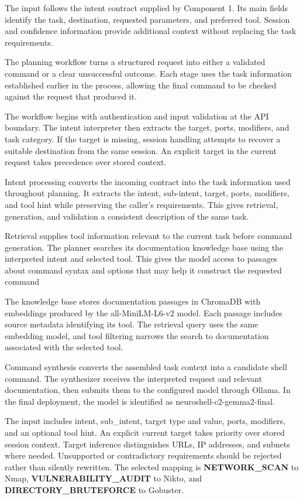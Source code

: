 \documentclass[
]{article}
\begin{document}
The input follows the intent contract supplied by Component 1. Its main
fields identify the task, destination, requested parameters, and
preferred tool. Session and confidence information provide additional
context without replacing the task requirements.

The planning workflow turns a structured request into either a validated
command or a clear unsuccessful outcome. Each stage uses the task
information established earlier in the process, allowing the final
command to be checked against the request that produced it.

The workflow begins with authentication and input validation at the API
boundary. The intent interpreter then extracts the target, ports,
modifiers, and task category. If the target is missing, session handling
attempts to recover a suitable destination from the same session. An
explicit target in the current request takes precedence over stored
context.

Intent processing converts the incoming contract into the task
information used throughout planning. It extracts the intent,
sub-intent, target, ports, modifiers, and tool hint while preserving the
caller's requirements. This gives retrieval, generation, and validation
a consistent description of the same task.

Retrieval supplies tool information relevant to the current task before
command generation. The planner searches its documentation knowledge
base using the interpreted intent and selected tool. This gives the
model access to passages about command syntax and options that may help
it construct the requested command

The knowledge base stores documentation passages in ChromaDB with
embeddings produced by the all-MiniLM-L6-v2 model. Each passage includes
source metadata identifying its tool. The retrieval query uses the same
embedding model, and tool filtering narrows the search to documentation
associated with the selected tool.

Command synthesis converts the assembled task context into a candidate
shell command. The synthesizer receives the interpreted request and
relevant documentation, then submits them to the configured model
through Ollama. In the final deployment, the model is identified as
neuroshell-c2-gemma2-final.

The input includes intent, sub\_intent, target type and value, ports,
modifiers, and an optional tool hint. An explicit current target takes
priority over stored session context. Target inference distinguishes
URLs, IP addresses, and subnets where needed. Unsupported or
contradictory requirements should be rejected rather than silently
rewritten. The selected mapping is \textbf{NETWORK\_SCAN} to Nmap,
\textbf{VULNERABILITY\_AUDIT} to Nikto, and
\textbf{DIRECTORY\_BRUTEFORCE} to Gobuster.
\end{document}
